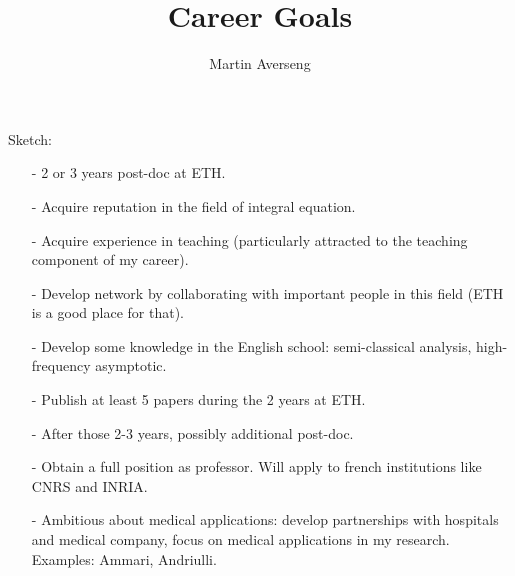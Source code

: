 \documentclass[]{article}
\title{Career Goals}
\author{Martin Averseng}
\begin{document}
\maketitle

Sketch:

\begin{itemize}
	\item[-] 2 or 3 years post-doc at ETH. 
	\item[-] Acquire reputation in the field of integral equation. 
	\item[-] Acquire experience in teaching (particularly attracted to the teaching component of my career). 
	\item[-] Develop network by collaborating with important people in this field (ETH is a good place for that). 
	\item[-] Develop some knowledge in the English school: semi-classical analysis, high-frequency asymptotic. 
	\item[-] Publish at least 5 papers during the 2 years at ETH.
	\item[-] After those 2-3 years, possibly additional post-doc.
	\item[-] Obtain a full position as professor. Will apply to french institutions like CNRS and INRIA. 
	\item[-] Ambitious about medical applications: develop partnerships with hospitals and medical company, focus on medical applications in my research. Examples: Ammari, Andriulli. 
\end{itemize}
\end{document}
